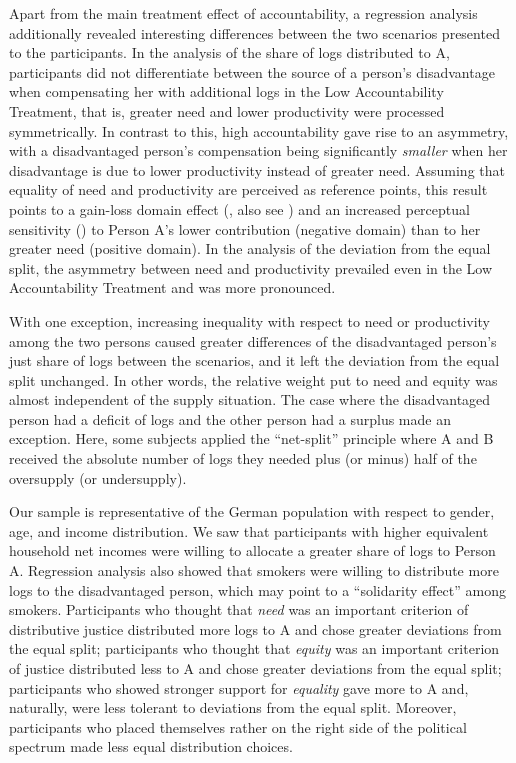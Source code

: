 \documentclass[smallcondensed]{svjour3}
\begin{document}
%
Apart from the main treatment effect of accountability, a regression analysis additionally revealed interesting differences between the two scenarios presented to the participants. In the analysis of the share of logs distributed to A, participants did not differentiate between the source of a person's disadvantage when compensating her with additional logs in the Low Accountability Treatment, that is, greater need and lower productivity were processed symmetrically. In contrast to this, high accountability gave rise to an asymmetry, with a disadvantaged person's compensation being significantly \textit{smaller} when her disadvantage is due to lower productivity instead of greater need. Assuming that equality of need and productivity are perceived as reference points, this result points to a gain-loss domain effect (\citealt{tversky_loss_1991}, also see \citealt{weis_needs_2017}) and an increased perceptual sensitivity (\citealt{trueblood_reference_2015}) to Person A's lower contribution (negative domain) than to her greater need (positive domain). In the analysis of the deviation from the equal split, the asymmetry between need and productivity prevailed even in the Low Accountability Treatment and was more pronounced.\par
%
With one exception, increasing inequality with respect to need or productivity among the two persons caused greater differences of the disadvantaged person's just share of logs between the scenarios, and it left the deviation from the equal split unchanged. In other words, the relative weight put to need and equity was almost independent of the supply situation. The case where the disadvantaged person had a deficit of logs and the other person had a surplus made an exception. Here, some subjects applied the ``net-split'' principle where A and B received the absolute number of logs they needed plus (or minus) half of the oversupply (or undersupply).\par
%
Our sample is representative of the German population with respect to gender, age, and income distribution. We saw that participants with higher equivalent household net incomes were willing to allocate a greater share of logs to Person A. Regression analysis also showed that smokers were willing to distribute more logs to the disadvantaged person, which may point to a ``solidarity effect'' among smokers. Participants who thought that \textit{need} was an important criterion of distributive justice distributed more logs to A and chose greater deviations from the equal split; participants who thought that \textit{equity} was an important criterion of justice distributed less to A and chose greater deviations from the equal split; participants who showed stronger support for \textit{equality} gave more to A and, naturally, were less tolerant to deviations from the equal split. Moreover, participants who placed themselves rather on the right side of the political spectrum made less equal distribution choices.\par
\end{document}
